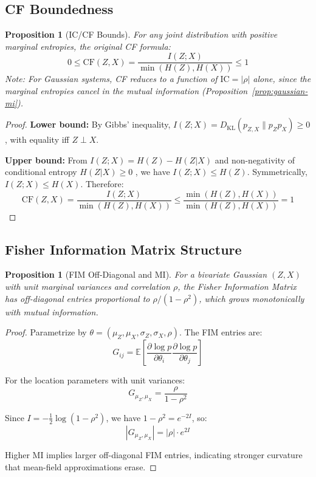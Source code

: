 \documentclass[10pt]{article} %
\theoremstyle{plain}
\newtheorem{proposition}[theorem]{Proposition}
\theoremstyle{definition}
\newcommand{\IC}{\mathrm{IC}}  %
\newcommand{\MI}{I}
\newcommand{\Ent}{H}
\newcommand{\KL}{D_{\mathrm{KL}}}
\newcommand{\E}{\mathbb{E}}
\begin{document}
\subsection{CF Boundedness}

\begin{proposition}[IC/CF Bounds]
\label{prop:cf-bounds}
For any joint distribution with positive marginal entropies, the original CF formula:
\[
0 \leq \text{CF}(Z, X) = \frac{I(Z;X)}{\min(H(Z), H(X))} \leq 1
\]
Note: For Gaussian systems, CF reduces to a function of $\IC = |\rho|$ alone, since the marginal entropies cancel in the mutual information (Proposition~\ref{prop:gaussian-mi}).
\end{proposition}

\begin{proof}
\textbf{Lower bound:} By Gibbs' inequality, $\MI(Z; X) = \KL(p_{Z,X} \| p_Z p_X) \geq 0$, with equality iff $Z \perp X$.

\textbf{Upper bound:} From $\MI(Z; X) = \Ent(Z) - \Ent(Z|X)$ and non-negativity of conditional entropy $\Ent(Z|X) \geq 0$ \citep{cover2006elements}, we have $\MI(Z;X) \leq \Ent(Z)$. Symmetrically, $\MI(Z;X) \leq \Ent(X)$. Therefore:
\[
\text{CF}(Z, X) = \frac{\MI(Z;X)}{\min(\Ent(Z), \Ent(X))} \leq \frac{\min(\Ent(Z), \Ent(X))}{\min(\Ent(Z), \Ent(X))} = 1
\]
\end{proof}

\subsection{Fisher Information Matrix Structure}

\begin{proposition}[FIM Off-Diagonal and MI]
\label{prop:fim-mi}
For a bivariate Gaussian $(Z, X)$ with unit marginal variances and correlation $\rho$, the Fisher Information Matrix has off-diagonal entries proportional to $\rho/(1-\rho^2)$, which grows monotonically with mutual information.
\end{proposition}

\begin{proof}
Parametrize by $\theta = (\mu_Z, \mu_X, \sigma_Z, \sigma_X, \rho)$. The FIM entries are:
\[
G_{ij} = \E\left[\frac{\partial \log p}{\partial \theta_i} \frac{\partial \log p}{\partial \theta_j}\right]
\]

For the location parameters with unit variances:
\[
G_{\mu_Z, \mu_X} = \frac{\rho}{1 - \rho^2}
\]

Since $\MI = -\frac{1}{2}\log(1-\rho^2)$, we have $1-\rho^2 = e^{-2\MI}$, so:
\[
|G_{\mu_Z, \mu_X}| = |\rho| \cdot e^{2\MI}
\]

Higher MI implies larger off-diagonal FIM entries, indicating stronger curvature that mean-field approximations erase.
\end{proof}
\end{document}
